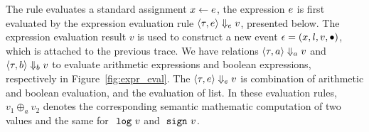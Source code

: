 The rule  evaluates a standard assignment $\mathrel{ x \leftarrow e }$, the expression $e$ is first evaluated by the expression evaluation rule $\langle \mathtt{\tau}, e \rangle \Downarrow_e v $, presented below.
The expression evaluation result $v$ is used to construct a new event $\mathtt{\epsilon} = (x, l, v,\bullet)$, which is attached to the previous trace.
We have relations $\langle \mathtt{\tau}, a \rangle \Downarrow_a v $ and $\langle \mathtt{\tau}, b \rangle \Downarrow_b v $ to evaluate arithmetic expressions and boolean expressions, respectively in Figure~\ref{fig:expr_eval}.
The $\langle \mathtt{\tau}, e \rangle \Downarrow_e v $ is combination of arithmetic and boolean evaluation, and the evaluation of list.
In these evaluation rules, $v_1 \oplus_a v_2$ denotes the corresponding semantic mathematic computation of two values and the same for $~\mathtt{log}~ v$ and $~\mathtt{sign}~ v$.

